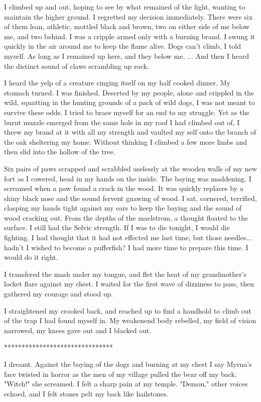 I climbed up and out, hoping to see by what remained of the light, wanting to maintain the higher ground. I regretted my decision immediately. There were six of them lean, athletic, mottled black and brown, two on either side of me below me, and two behind. I was a cripple armed only with a burning brand. I swung it quickly in the air around me to keep the flame alive. Dogs can't climb, I told myself. As long as I remained up here, and they below me, ... And then I heard the distinct sound of claws scrambling up rock.

I heard the yelp of a creature cinging itself on my half cooked dinner. My stomach turned. I was finished. Deserted by my people, alone and crippled in the wild, squatting in the hunting grounds of a pack of wild dogs, I was not meant to survive these odds. I tried to brace myself for an end to my struggle. Yet as the burnt muzzle emerged from the same hole in my roof I had climbed out of, I threw my brand at it with all my strength and vaulted my self onto the branch of the oak sheltering my home. Without thinking I climbed a few more limbs and then slid into the hollow of the tree.

Six pairs of paws scrapped and scrabbled uselessly at the wooden walls of my new fort as I cowered, head in my hands on the inside. The baying was maddening. I screamed when a paw found a crack in the wood. It was quickly replaces by a shiny black nose and the sound fervent gnawing of wood. I sat, cornered, terrified, clasping my hands tight against my ears to keep the baying and the sound of wood cracking out. From the depths of the maelstrom, a thought floated to the surface. I still had the Selvic strength. If I was to die tonight, I would die fighting. I had thought that it had not effected me last time, but those needles... hadn't I wished to become a pufferfish? I had more time to prepare this time. I would do it right.

I transfered the mash under my tongue, and flet the heat of my grandmother's locket flare against my chest. I waited for the first wave of dizziness to pass, then gathered my courage and stood up. 

I straightened my crooked back, and reached up to find a handhold to climb out of the trap I had found myself in. My weakenend body rebelled, my field of vision narrowed, my knees gave out and I blacked out.

*******************************

I dreamt. Against the baying of the dogs and burning at my chest I say Myrna's face twisted in horror as the men of my village pulled the bear off my back. "Witch!" she screamed. I felt a sharp pain at my temple. "Demon," other voices echoed, and I felt stones pelt my back like hailstones. 

